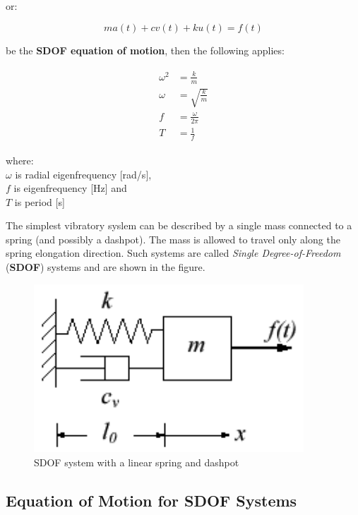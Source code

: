 \documentclass[10pt,b5paper,titlepage]{book}
\newenvironment{eqarray}
{
    \begin{eqnarray}
        \begin{aligned}
}
{
        \end{aligned}
    \end{eqnarray}
}
\begin{document}
or:

\begin{equation}
    m a(t) + c v(t) + k u(t) = f(t)
\end{equation}

be the \textbf{SDOF equation of motion}, then the following applies:

\begin{eqarray}
    \omega^2 &= \frac{k}{m} \\
    \omega &= \sqrt{\frac{k}{m}} \\
    f &= \frac{\omega}{2 \pi} \\
    T &= \frac{1}{f}
\end{eqarray}

where:\\
$ \omega $ is radial eigenfrequency [rad/s],\\
$ f $ is eigenfrequency [Hz] and\\
$ T $ is period [s]

The simplest vibratory syslem can be described by a single mass connected to a spring
(and possibly a dashpot). The mass is allowed to travel only along the spring elongation
direction. Such systems are called \textit{Single Degree-of-Freedom} (\textbf{SDOF})
systems and are shown in the figure.

\begin{figure}[ht]
    \centering
    \includegraphics[width=0.90\textwidth]{img/SDOF_plot.png}
    \caption{SDOF system with a linear spring and dashpot}
    \label{fig:SDOF-plot-png}
\end{figure}

\subsection{Equation of Motion for SDOF Systems}
\end{document}
